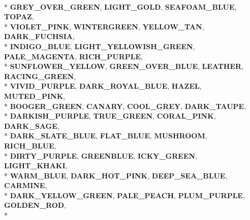 \begin{DoxyCompactItemize}
\\*
{\bfseries G\+R\+E\+Y\+\_\+\+O\+V\+E\+R\+\_\+\+G\+R\+E\+EN}, 
{\bfseries L\+I\+G\+H\+T\+\_\+\+G\+O\+LD}, 
{\bfseries S\+E\+A\+F\+O\+A\+M\+\_\+\+B\+L\+UE}, 
{\bfseries T\+O\+P\+AZ}, 
\\*
{\bfseries V\+I\+O\+L\+E\+T\+\_\+\+P\+I\+NK}, 
{\bfseries W\+I\+N\+T\+E\+R\+G\+R\+E\+EN}, 
{\bfseries Y\+E\+L\+L\+O\+W\+\_\+\+T\+AN}, 
{\bfseries D\+A\+R\+K\+\_\+\+F\+U\+C\+H\+S\+IA}, 
\\*
{\bfseries I\+N\+D\+I\+G\+O\+\_\+\+B\+L\+UE}, 
{\bfseries L\+I\+G\+H\+T\+\_\+\+Y\+E\+L\+L\+O\+W\+I\+S\+H\+\_\+\+G\+R\+E\+EN}, 
{\bfseries P\+A\+L\+E\+\_\+\+M\+A\+G\+E\+N\+TA}, 
{\bfseries R\+I\+C\+H\+\_\+\+P\+U\+R\+P\+LE}, 
\\*
{\bfseries S\+U\+N\+F\+L\+O\+W\+E\+R\+\_\+\+Y\+E\+L\+L\+OW}, 
{\bfseries G\+R\+E\+E\+N\+\_\+\+O\+V\+E\+R\+\_\+\+B\+L\+UE}, 
{\bfseries L\+E\+A\+T\+H\+ER}, 
{\bfseries R\+A\+C\+I\+N\+G\+\_\+\+G\+R\+E\+EN}, 
\\*
{\bfseries V\+I\+V\+I\+D\+\_\+\+P\+U\+R\+P\+LE}, 
{\bfseries D\+A\+R\+K\+\_\+\+R\+O\+Y\+A\+L\+\_\+\+B\+L\+UE}, 
{\bfseries H\+A\+Z\+EL}, 
{\bfseries M\+U\+T\+E\+D\+\_\+\+P\+I\+NK}, 
\\*
{\bfseries B\+O\+O\+G\+E\+R\+\_\+\+G\+R\+E\+EN}, 
{\bfseries C\+A\+N\+A\+RY}, 
{\bfseries C\+O\+O\+L\+\_\+\+G\+R\+EY}, 
{\bfseries D\+A\+R\+K\+\_\+\+T\+A\+U\+PE}, 
\\*
{\bfseries D\+A\+R\+K\+I\+S\+H\+\_\+\+P\+U\+R\+P\+LE}, 
{\bfseries T\+R\+U\+E\+\_\+\+G\+R\+E\+EN}, 
{\bfseries C\+O\+R\+A\+L\+\_\+\+P\+I\+NK}, 
{\bfseries D\+A\+R\+K\+\_\+\+S\+A\+GE}, 
\\*
{\bfseries D\+A\+R\+K\+\_\+\+S\+L\+A\+T\+E\+\_\+\+B\+L\+UE}, 
{\bfseries F\+L\+A\+T\+\_\+\+B\+L\+UE}, 
{\bfseries M\+U\+S\+H\+R\+O\+OM}, 
{\bfseries R\+I\+C\+H\+\_\+\+B\+L\+UE}, 
\\*
{\bfseries D\+I\+R\+T\+Y\+\_\+\+P\+U\+R\+P\+LE}, 
{\bfseries G\+R\+E\+E\+N\+B\+L\+UE}, 
{\bfseries I\+C\+K\+Y\+\_\+\+G\+R\+E\+EN}, 
{\bfseries L\+I\+G\+H\+T\+\_\+\+K\+H\+A\+KI}, 
\\*
{\bfseries W\+A\+R\+M\+\_\+\+B\+L\+UE}, 
{\bfseries D\+A\+R\+K\+\_\+\+H\+O\+T\+\_\+\+P\+I\+NK}, 
{\bfseries D\+E\+E\+P\+\_\+\+S\+E\+A\+\_\+\+B\+L\+UE}, 
{\bfseries C\+A\+R\+M\+I\+NE}, 
\\*
{\bfseries D\+A\+R\+K\+\_\+\+Y\+E\+L\+L\+O\+W\+\_\+\+G\+R\+E\+EN}, 
{\bfseries P\+A\+L\+E\+\_\+\+P\+E\+A\+CH}, 
{\bfseries P\+L\+U\+M\+\_\+\+P\+U\+R\+P\+LE}, 
{\bfseries G\+O\+L\+D\+E\+N\+\_\+\+R\+OD}, 
\\*

\end{DoxyCompactItemize}
